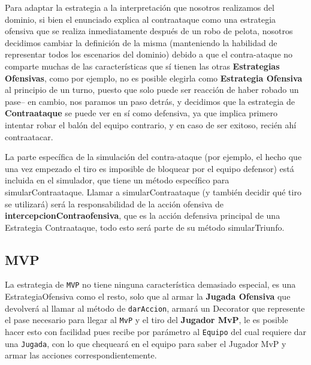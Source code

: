 Para adaptar la estrategia a la interpretación que nosotros realizamos del dominio, si bien el enunciado explica al contraataque como una estrategia ofensiva que se realiza inmediatamente después de un robo de pelota, nosotros decidimos cambiar la definición de la misma (manteniendo la habilidad de representar todos los escenarios del dominio) debido a que el contra-ataque no comparte muchas de las características que sí tienen las otras \textbf{Estrategias Ofensivas}, como por ejemplo, no es posible elegirla como \textbf{Estrategia Ofensiva} al principio de un turno, puesto que solo puede ser reacción de haber robado un pase-- en cambio, nos paramos un paso detrás, y decidimos que la estrategia de \textbf{Contraataque} se puede ver en sí como defensiva, ya que implica primero intentar robar el balón del equipo contrario, y en caso de ser exitoso, recién ahí contraatacar.

La parte específica de la simulación del contra-ataque (por ejemplo, el hecho que una vez empezado el tiro es imposible de bloquear por el equipo defensor) está incluida en el simulador, que tiene un método específico para simularContraataque. Llamar a simularContraataque (y también decidir qué tiro se utilizará) será la responsabilidad de la acción ofensiva de \textbf{intercepcionContraofensiva}, que es la acción defensiva principal de una Estrategia Contraataque, todo esto será parte de su método simularTriunfo.

\subsection{MVP}

La estrategia de \texttt{MVP} no tiene ninguna característica demasiado especial, es una 
EstrategiaOfensiva como el resto, solo que al armar la \textbf{Jugada Ofensiva} que 
devolverá al llamar al método de \texttt{darAccion}, armará un Decorator que represente 
el pase necesario para llegar al \texttt{MvP} y el tiro del \textbf{Jugador MvP}, le es posible hacer esto con 
facilidad pues recibe por parámetro al \texttt{Equipo} del cual requiere dar una \texttt{Jugada}, 
con lo que chequeará en el equipo para saber el Jugador MvP y armar las acciones correspondientemente.


